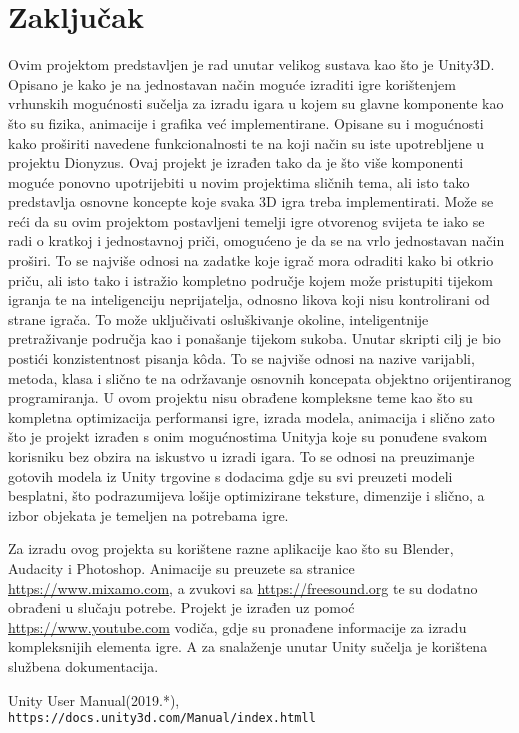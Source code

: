 \section{Zaključak}
Ovim projektom predstavljen je rad unutar velikog sustava kao što je Unity3D. Opisano je kako je na jednostavan način moguće izraditi igre korištenjem vrhunskih mogućnosti sučelja za izradu igara u kojem su glavne komponente kao što su fizika, animacije i grafika već implementirane. Opisane su i mogućnosti kako proširiti navedene funkcionalnosti te na koji način su iste upotrebljene u projektu Dionyzus. Ovaj projekt je izrađen tako da je što više komponenti moguće ponovno upotrijebiti u novim projektima sličnih tema, ali isto tako predstavlja osnovne koncepte koje svaka 3D igra treba implementirati. 
Može se reći da su ovim projektom postavljeni temelji igre otvorenog svijeta te iako se radi o kratkoj i jednostavnoj priči, omogućeno je da se na vrlo jednostavan način proširi. To se najviše odnosi na zadatke koje igrač mora odraditi kako bi otkrio priču, ali isto tako i istražio kompletno područje kojem može pristupiti tijekom igranja te na inteligenciju neprijatelja, odnosno likova koji nisu kontrolirani od strane igrača. To može uključivati osluškivanje okoline, inteligentnije pretraživanje područja kao i ponašanje tijekom sukoba.
Unutar skripti cilj je bio postići konzistentnost pisanja k\^oda. To se najviše odnosi na nazive varijabli, metoda, klasa i slično te na održavanje osnovnih koncepata objektno orijentiranog programiranja.
U ovom projektu nisu obrađene kompleksne teme kao što su kompletna optimizacija performansi igre, izrada modela, animacija i slično zato što je projekt izrađen s onim mogućnostima Unityja koje su ponuđene svakom korisniku bez obzira na iskustvo u izradi igara. To se odnosi na preuzimanje gotovih modela iz Unity trgovine s dodacima gdje su svi preuzeti modeli besplatni, što podrazumijeva lošije optimizirane teksture, dimenzije i slično, a izbor objekata je temeljen na potrebama igre.

Za izradu ovog projekta su korištene razne aplikacije kao što su Blender, Audacity i Photoshop.
Animacije su preuzete sa stranice \url{https://www.mixamo.com}, a zvukovi sa \url{https://freesound.org} te su dodatno obrađeni u slučaju potrebe.
Projekt je izrađen uz pomoć \url{https://www.youtube.com} vodiča, gdje su pronađene informacije za izradu kompleksnijih elementa igre. A za snalaženje unutar Unity sučelja je korištena službena dokumentacija.
\begin{thebibliography}{9}
Unity User Manual(2019.*),
\\\texttt{https://docs.unity3d.com/Manual/index.htmll}
\end{thebibliography}